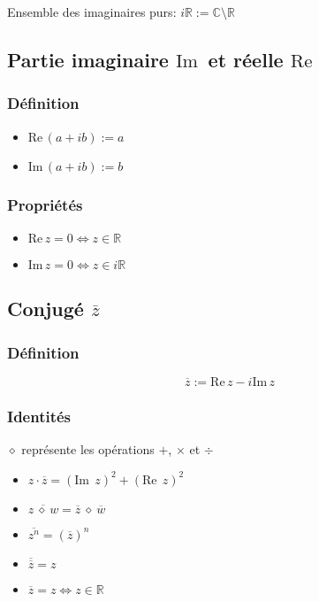 \documentclass{article}
\newcommand{\im}{\text{Im}\,}
\newcommand{\re}{\text{Re}\,}
\newcommand{\R}{\mathds{R}}
\newcommand{\C}{\mathds{C}}
\newcommand{\conj}[1]{\overline{#1}}
\newcommand{\placeholder}{\diamond}
\begin{document}
Ensemble des imaginaires purs: $i\R := \C \setminus \R$

\subsection{Partie imaginaire $\im$ et réelle $\re$}
\subsubsection{Définition}
\begin{itemize}
    \item $\re(a + ib) := a$
    \item $\im(a + ib) := b$
\end{itemize}
\subsubsection{Propriétés}
\begin{itemize}
    \item $\re z = 0 \iff z \in \R$
    \item $\im z = 0 \iff z \in i\R$
\end{itemize}

\subsection{Conjugé $\conj{z}$}

\subsubsection{Définition}
\[\conj{z} := \re z - i\im z\]



\subsubsection{Identités}

$\placeholder$ représente les opérations $+$, $\times$ et $\div$

\begin{itemize}
    \item $z\cdot\conj{z} = (\im\; z)^2 + (\re\; z)^2$
    \item $\conj{z \:\placeholder\: w} = \conj{z} \:\placeholder\: \conj{w}$
    \item $\conj{z^n} = (\conj{z})^n$
    \item $\conj{\conj{z}} = z $
    \item $\conj{z} = z \iff z \in \R$
\end{itemize}
\end{document}
